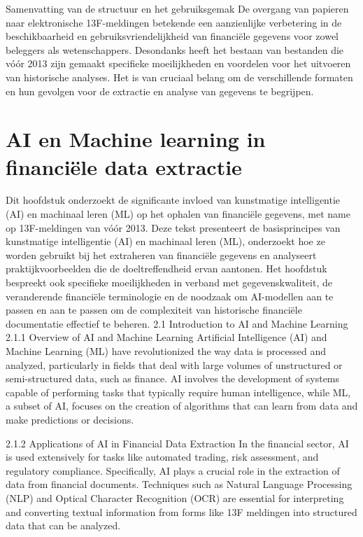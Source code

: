 Samenvatting van de structuur en het gebruiksgemak
De overgang van papieren naar elektronische 13F-meldingen betekende een aanzienlijke verbetering in de beschikbaarheid en gebruiksvriendelijkheid van financiële gegevens voor zowel beleggers als wetenschappers. Desondanks heeft het bestaan van bestanden die vóór 2013 zijn gemaakt specifieke moeilijkheden en voordelen voor het uitvoeren van historische analyses. Het is van cruciaal belang om de verschillende formaten en hun gevolgen voor de extractie en analyse van gegevens te begrijpen.




\section{AI en Machine learning in financiële data extractie}
Dit hoofdstuk onderzoekt de significante invloed van kunstmatige intelligentie (AI) en machinaal leren (ML) op het ophalen van financiële gegevens, met name op 13F-meldingen van vóór 2013. Deze tekst presenteert de basisprincipes van kunstmatige intelligentie (AI) en machinaal leren (ML), onderzoekt hoe ze worden gebruikt bij het extraheren van financiële gegevens en analyseert praktijkvoorbeelden die de doeltreffendheid ervan aantonen. Het hoofdstuk bespreekt ook specifieke moeilijkheden in verband met gegevenskwaliteit, de veranderende financiële terminologie en de noodzaak om AI-modellen aan te passen en aan te passen om de complexiteit van historische financiële documentatie effectief te beheren.
2.1 Introduction to AI and Machine Learning
2.1.1 Overview of AI and Machine Learning
Artificial Intelligence (AI) and Machine Learning (ML) have revolutionized the way data is processed and analyzed, particularly in fields that deal with large volumes of unstructured or semi-structured data, such as finance. AI involves the development of systems capable of performing tasks that typically require human intelligence, while ML, a subset of AI, focuses on the creation of algorithms that can learn from data and make predictions or decisions.

2.1.2 Applications of AI in Financial Data Extraction
In the financial sector, AI is used extensively for tasks like automated trading, risk assessment, and regulatory compliance. Specifically, AI plays a crucial role in the extraction of data from financial documents. Techniques such as Natural Language Processing (NLP) and Optical Character Recognition (OCR) are essential for interpreting and converting textual information from forms like 13F meldingen into structured data that can be analyzed.

